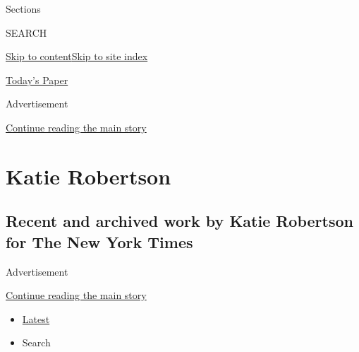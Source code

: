 Sections

SEARCH

\protect\hyperlink{site-content}{Skip to
content}\protect\hyperlink{site-index}{Skip to site index}

\href{https://myaccount.nytimes3xbfgragh.onion/auth/login?response_type=cookie\&client_id=vi}{}

\href{https://www.nytimes3xbfgragh.onion/section/todayspaper}{Today's
Paper}

Advertisement

\protect\hyperlink{after-top}{Continue reading the main story}

\hypertarget{katie-robertson}{%
\section{Katie Robertson}\label{katie-robertson}}

\hypertarget{recent-and-archived-work-by-katie-robertson-for-the-new-york-times}{%
\subsection{Recent and archived work by Katie Robertson for The New York
Times}\label{recent-and-archived-work-by-katie-robertson-for-the-new-york-times}}

Advertisement

\protect\hyperlink{after-mid1}{Continue reading the main story}

\begin{itemize}
\tightlist
\item
  \protect\hyperlink{stream-panel}{Latest}
\item
  Search
\end{itemize}

